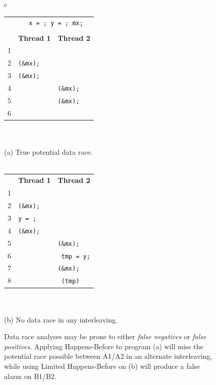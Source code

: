 \begin{figure}[h]
        \small
	\begin{center}
\begin{tabular}{c}
\begin{tabular}{rll}
	\\
	& \multicolumn{2}{c}{\texttt{\ctype{int} x = \const{0}; \ctype{bool} y = \const{false}; \ctype{mutex\_t} mx;}} \\
        \\
        & {\bf Thread 1} & {\bf Thread 2} \\
	1 & \texttt{\hilight{brickred}{x++;}~\ccomment{// A1}} & \\
	2 & \texttt{\call{mutex\_lock}(\&mx);} & \\
	3 & \texttt{\call{mutex\_unlock}(\&mx);} & \\
	4 & & \texttt{\call{mutex\_lock}(\&mx);} \\
	5 & & \texttt{\call{mutex\_unlock}(\&mx);} \\
	6 & & \texttt{\hilight{brickred}{x++;}~\ccomment{// A2}} \\
\end{tabular}
\\
\\
	{\normalsize (a) True potential data race.}
\\
\\
\begin{tabular}{rll}
        & {\bf Thread 1} & {\bf Thread 2} \\
	1 & \texttt{\hilight{brickred}{x++;}~\ccomment{// B1}} & \\
	2 & \texttt{\call{mutex\_lock}(\&mx);} & \\
	3 & \texttt{y = \const{true};} & \\
	4 & \texttt{\call{mutex\_unlock}(\&mx);} & \\
	5 & & \texttt{\call{mutex\_lock}(\&mx);} \\
	6 & & \texttt{\ctype{bool} tmp = y;} \\
	7 & & \texttt{\call{mutex\_unlock}(\&mx);} \\
	8 & & \texttt{\flow{if} (tmp) \hilight{brickred}{x++;}~\ccomment{// B2}} \\
\end{tabular}
\\
\\
{\normalsize (b) No data race in any interleaving.}
\end{tabular}
	\end{center}
	\caption[Data race analyses may be prone to either {\em false negatives} or {\em false positives}.]
		{{Data race analyses may be prone to either {\em false negatives} or {\em false positives}.
	Applying Happens-Before to program (a) will miss the potential race possible between A1/A2 in an alternate interleaving,
	while using Limited Happens-Before on (b) will produce a false alarm on B1/B2.}}
\label{fig:hb-example}
\end{figure}

